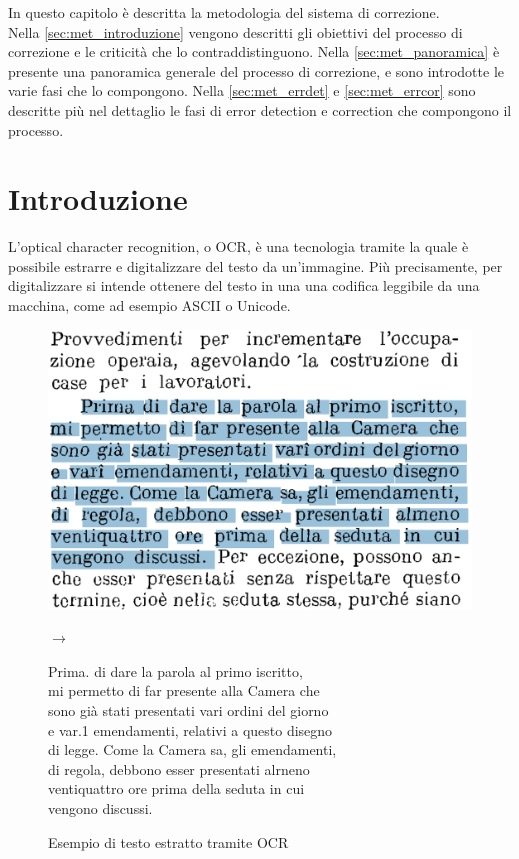 In questo capitolo è descritta la metodologia del sistema di correzione.\\
Nella \autoref{sec:met_introduzione} vengono descritti gli obiettivi del processo di correzione e le criticità che lo contraddistinguono.
Nella \autoref{sec:met_panoramica} è presente una panoramica generale del processo di correzione, e sono introdotte le varie fasi che lo compongono. Nella \autoref{sec:met_errdet} e \autoref{sec:met_errcor} sono descritte più nel dettaglio le fasi di error detection e correction che compongono il processo.


\section{Introduzione}
\label{sec:met_introduzione}
L'optical character recognition, o OCR, è una tecnologia tramite la quale è possibile estrarre e digitalizzare del testo da un'immagine. Più precisamente, per digitalizzare si intende ottenere del testo in una una codifica leggibile da una macchina, come ad esempio ASCII o Unicode.

\begin{figure}[H]
\centering
{
\begin{minipage}{0.4\textwidth}
\includegraphics[width=\textwidth]{immagini/metodologia/ocr_ex.png}
\end{minipage} \hfill
\begin{minipage}{0.06\textwidth}
\Large$\rightarrow$
\end{minipage}
\begin{minipage}{0.5\textwidth}
\footnotesize	
Prima. di dare la parola al primo iscritto, \\
mi permetto di far presente alla Camera che \\
sono già stati presentati vari ordini del giorno \\
e var.1 emendamenti, relativi a questo disegno \\
di legge. Come la Camera sa, gli emendamenti, \\
di regola, debbono esser presentati alrneno \\
ventiquattro ore prima della seduta in cui \\
vengono discussi.
\end{minipage}
\caption{Esempio di testo estratto tramite OCR}
\label{fig:met_ocr_esempio}
}
\end{figure}

